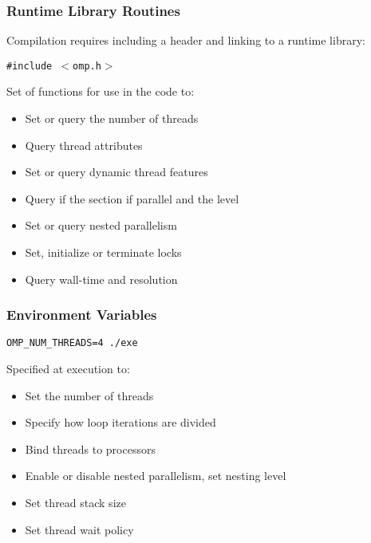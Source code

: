 \begin{frame}
\frametitle{Runtime Library Routines}

Compilation requires including a header and linking to a runtime library:

\begin{center}
\texttt{\#include $<$omp.h$>$}
\end{center}

\medskip
Set of functions for use in the code to:
\begin{itemize}
\item Set or query the number of threads
\item Query thread attributes
\item Set or query dynamic thread features 
\item Query if the section if parallel and the level
\item Set or query nested parallelism
\item Set, initialize or terminate locks
\item Query wall-time and resolution
\end{itemize}

\end{frame}

\begin{frame}
\frametitle{Environment Variables}

\begin{center}
\texttt{OMP\_NUM\_THREADS=4 ./exe}
\end{center}

\medskip
Specified at execution to:
\begin{itemize}
\item Set the number of threads
\item Specify how loop iterations are divided
\item Bind threads to processors
\item Enable or disable nested parallelism, set nesting level
\item Set thread stack size
\item Set thread wait policy
\end{itemize}

\end{frame}

